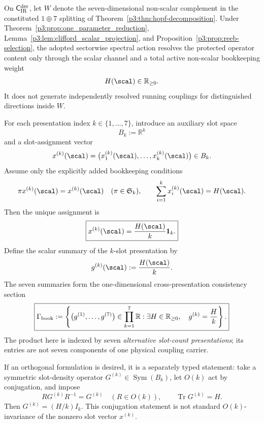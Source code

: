 \documentclass[11pt,a4paper]{article}
\begin{document}
\begin{proposition}
\label{p3:prop:canonical_harmonic_lift}
On \(\mathsf C_{\rm IR}^{\rm der}\), let \(W\) denote the seven-dimensional
non-scalar complement in the constituted \(1\oplus7\) splitting of
Theorem~\ref{p3:thm:hopf-decomposition}.  Under
Theorem~\ref{p3:prop:one_parameter_reduction},
Lemma~\ref{p3:lem:clifford_scalar_projection}, and
Proposition~\ref{p3:prop:reeb-selection}, the adopted sectorwise spectral
action resolves the protected operator content only through the scalar channel
and a total active non-scalar bookkeeping weight
\[
 H(\scal)\in\mathbb R_{\ge0}.
\]
It does not generate independently resolved running couplings for
distinguished directions inside \(W\).

For each presentation index \(k\in\{1,\ldots,7\}\), introduce an auxiliary
slot space
\[
 B_k:=\mathbb R^k
\]
and a slot-assignment vector
\[
 x^{(k)}(\scal)
 =\bigl(x^{(k)}_1(\scal),\ldots,x^{(k)}_k(\scal)\bigr)\in B_k.
\]
Assume only the explicitly added bookkeeping conditions
\[
 \pi x^{(k)}(\scal)=x^{(k)}(\scal)
 \quad(\pi\in\mathfrak S_k),
 \qquad
 \sum_{i=1}^k x_i^{(k)}(\scal)=H(\scal).
\]
Then the unique assignment is
\[
 \boxed{x^{(k)}(\scal)=\frac{H(\scal)}k\mathbf1_k.}
\]
Define the scalar summary of the \(k\)-slot presentation by
\[
 g^{(k)}(\scal):=\frac{H(\scal)}k.
\]
The seven summaries form the one-dimensional cross-presentation consistency
section
\[
 \boxed{
 \Gamma_{\rm book}
 :=\left\{
   \bigl(g^{(1)},\ldots,g^{(7)}\bigr)
   \in\prod_{k=1}^7\mathbb R:
   \exists H\in\mathbb R_{\ge0},\quad g^{(k)}=\frac Hk
 \right\}.}
\]
The product here is indexed by seven \emph{alternative slot-count
presentations}; its entries are not seven components of one physical coupling
carrier.

If an orthogonal formulation is desired, it is a separately typed statement:
take a symmetric slot-density operator
\(G^{(k)}\in\operatorname{Sym}(B_k)\), let \(O(k)\) act by conjugation, and
impose
\[
 R G^{(k)}R^{-1}=G^{(k)}\quad(R\in O(k)),
 \qquad \operatorname{Tr}G^{(k)}=H.
\]
Then \(G^{(k)}=(H/k)I_k\).  This conjugation statement is not standard
\(O(k)\)-invariance of the nonzero slot vector \(x^{(k)}\).
\end{proposition}
\end{document}
